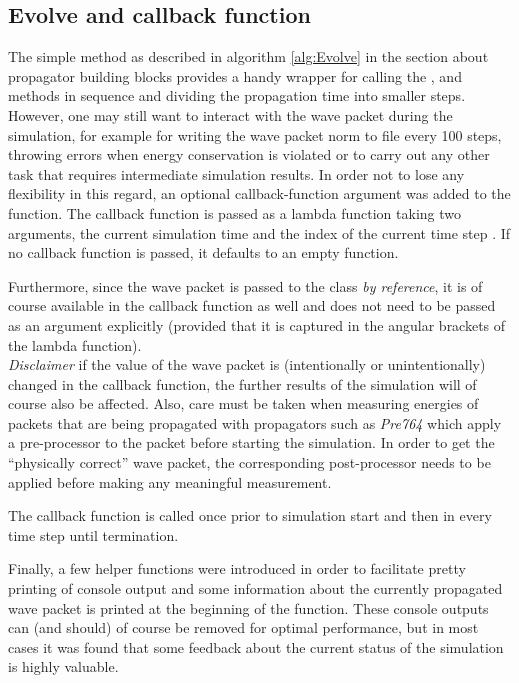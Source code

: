 \subsection{Evolve and callback function}
\label{subsec:callback}
%
The simple  method as described in algorithm \ref{alg:Evolve} in the section about propagator building blocks provides a handy wrapper for calling the ,  and  methods in sequence and dividing the propagation time into smaller steps. \\
%
However, one may still want to interact with the wave packet during the simulation, for example for writing the wave packet norm to file every 100 steps, throwing errors when energy conservation is violated or to carry out any other task that requires intermediate simulation results.
In order not to lose any flexibility in this regard, an optional callback-function argument was added to the  function.
The callback function is passed as a lambda function taking two arguments, the current simulation time  and the index of the current time step .
If no callback function is passed, it defaults to an empty function.
\par\medskip
%
Furthermore, since the wave packet is passed to the  class \emph{by reference}, it is of course available in the callback function as well and does not need to be passed as an argument explicitly (provided that it is captured in the angular brackets \proc{[]} of the lambda function). \\
\emph{Disclaimer} if the value of the wave packet is (intentionally or unintentionally) changed in the callback function, the further results of the simulation will of course also be affected.
Also, care must be taken when measuring energies of packets that are being propagated with propagators such as \emph{Pre764} which apply a pre-processor to the packet before starting the simulation.
In order to get the ``physically correct'' wave packet, the corresponding post-processor needs to be applied before making any meaningful measurement.
\par\medskip
%
The callback function is called once prior to simulation start and then in every time step until termination.
\par\medskip
%
Finally, a few helper functions were introduced in order to facilitate pretty printing of console output and some information about the currently propagated wave packet is printed at the beginning of the  function.
These console outputs can (and should) of course be removed for optimal performance, but in most cases it was found that some feedback about the current status of the simulation is highly valuable.


